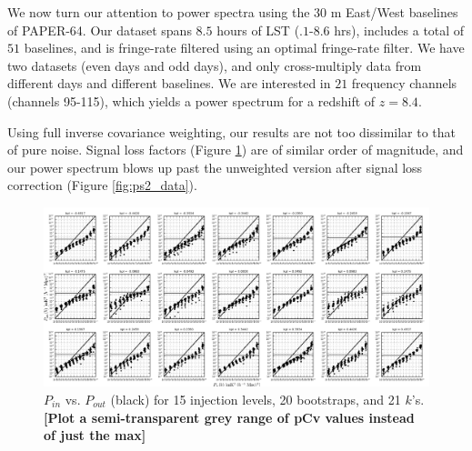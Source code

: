 \documentclass[preprint2,numberedappendix,tighten,twocolappendix]{aastex6}  %
\newcommand{\cc}[1]{{\color{purple} \textbf{[#1]}}}
\begin{document}
We now turn our attention to power spectra using the 30 m East/West baselines of PAPER-64. Our dataset spans $8.5$ hours of LST ($.1$-$8.6$ hrs), includes a total of $51$ baselines, and is fringe-rate filtered using an optimal fringe-rate filter. We have two datasets (even days and odd days), and only cross-multiply data from different days and different baselines. We are interested in $21$ frequency channels (channels 95-115), which yields a power spectrum for a redshift of $z=8.4$. 

Using full inverse covariance weighting, our results are not too dissimilar to that of pure noise. Signal loss factors (Figure \ref{fig:sigloss2_data}) are of similar order of magnitude, and our power spectrum blows up past the unweighted version after signal loss correction (Figure \ref{fig:ps2_data}).


\begin{figure}
	\centering
	\includegraphics[width=1.0\textwidth]{sigloss2_data.png}
	\caption{$P_{in}$ vs. $P_{out}$ (black) for 15 injection levels, 20 bootstraps, and 21 $k$'s. \cc{Plot a semi-transparent grey range of pCv values instead of just the max}}
	\label{fig:sigloss2_data}
\end{figure}
\end{document}
